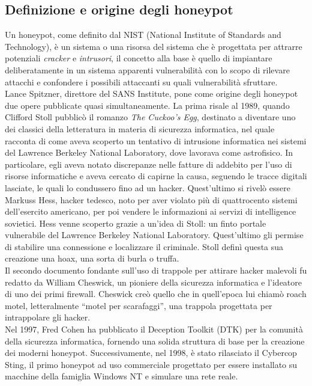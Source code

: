 \subsection{Definizione e origine degli honeypot}
Un honeypot, come definito dal NIST (National Institute of Standards and Technology), è un sistema o una risorsa del sistema che è progettata per attrarre potenziali \textit{cracker} e \textit{intrusori}, il concetto alla base è quello di impiantare deliberatamente in un sistema apparenti vulnerabilità con lo scopo di rilevare attacchi e confondere i possibili attaccanti su quali vulnerabilità sfruttare\cite{nistHoneypot}.\\
Lance Spitzner, direttore del SANS Institute, pone come origine degli honeypot due opere pubblicate quasi simultaneamente\cite{spitzner}. La prima risale al 1989, quando Clifford Stoll pubblicò il romanzo \textit{The Cuckoo’s Egg}, destinato a diventare uno dei classici della letteratura in materia di sicurezza informatica, nel quale racconta di come aveva scoperto un tentativo di intrusione informatica nei sistemi del Lawrence Berkeley National Laboratory, dove lavorava come astrofisico. In particolare, egli aveva notato discrepanze nelle fatture di addebito per l’uso di risorse informatiche e aveva cercato di capirne la causa, seguendo le tracce digitali lasciate, le quali lo condussero fino ad un hacker. Quest’ultimo si rivelò essere Markuss Hess, hacker tedesco, noto per aver violato più di quattrocento sistemi dell’esercito americano, per poi vendere le informazioni ai servizi di intelligence sovietici. Hess venne scoperto grazie a un’idea di Stoll: un finto portale vulnerabile del Lawrence Berkeley National Laboratory. Quest'ultimo gli permise di stabilire una connessione e localizzare il criminale. Stoll definì questa sua creazione una hoax, una sorta di burla o truffa\cite{TheCuckoosEgg}.\\
Il secondo documento fondante sull'uso di trappole per attirare hacker malevoli fu redatto da William Cheswick, un pioniere della sicurezza informatica e l'ideatore di uno dei primi firewall. Cheswick creò quello che in quell'epoca lui chiamò roach motel, letteralmente “motel per scarafaggi”, una trappola progettata per intrappolare gli hacker\cite{cheswick}.\\
Nel 1997, Fred Cohen ha pubblicato il Deception Toolkit (DTK) per la comunità della sicurezza informatica, fornendo una solida struttura di base per la creazione dei moderni honeypot. Successivamente, nel 1998, è stato rilasciato il Cybercop Sting, il primo honeypot ad uso commerciale progettato per essere installato su macchine della famiglia Windows NT e simulare una rete reale\cite{spitzner}.\\
